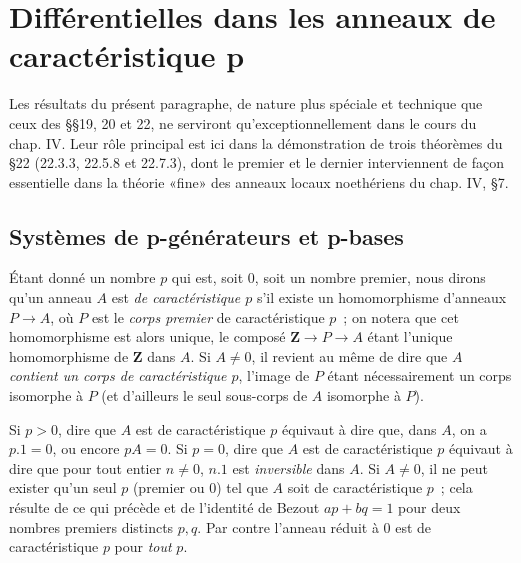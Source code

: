 \section{Différentielles dans les anneaux de caractéristique p}
Les résultats du présent paragraphe, de nature plus spéciale et technique que
ceux des §§19, 20 et 22, ne serviront qu'exceptionnellement dans le cours du
chap. IV. Leur rôle principal est ici dans la démonstration de trois théorèmes
du §22 (22.3.3, 22.5.8 et 22.7.3), dont le premier et le dernier interviennent
de façon essentielle dans la théorie «fine» des anneaux locaux noethériens du
chap. IV, §7.
\subsection{Systèmes de p-générateurs et p-bases}
\label{0.21.1-fr}

\begin{env}[21.1.1]
\label{0.21.1.1-fr}
Étant donné un nombre $p$ qui est, soit $0$, soit un nombre premier, nous
dirons qu'un anneau $A$ est \emph{de caractéristique $p$} s'il existe un homomorphisme
d'anneaux $P\to A$, où $P$ est le \emph{corps premier} de caractéristique $p$~; on
notera que cet homomorphisme est alors unique, le composé
$\mathbf Z\to P\to A$ étant l'unique homomorphisme de $\mathbf Z$ dans $A$.
Si $A\neq0$, il revient au même de dire que $A$ \emph{contient un corps de
caractéristique $p$}, l'image de $P$ étant nécessairement un corps isomorphe à
$P$ (et d'ailleurs le seul sous-corps de $A$ isomorphe à $P$).
\end{env}

\begin{env}[21.1.2]
\label{0.21.1.2-fr}
Si $p>0$, dire que $A$ est de caractéristique $p$ équivaut à dire que, dans
$A$, on a $p.1=0$, ou encore $pA=0$. Si $p=0$, dire que $A$ est de
caractéristique $p$ équivaut à dire que pour tout entier $n\neq0$, $n.1$
est \emph{inversible} dans $A$. Si $A\neq0$, il ne peut exister qu'un seul $p$
(premier ou $0$) tel que $A$ soit de caractéristique $p$~; cela résulte de ce qui précède et de
l'identité de Bezout $ap+bq=1$ pour deux nombres premiers distincts $p,q$.
Par contre l'anneau réduit à $0$ est de caractéristique $p$ pour \emph{tout} $p$.
\end{env}

